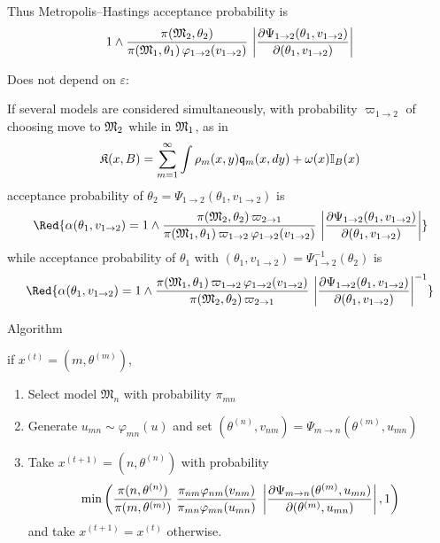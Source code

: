 \begin{slide}
Thus Metropolis--Hastings acceptance probability is
\small$$
1 \wedge \frac{\pi(\mathfrak{M}_2,\theta_2)}{\pi(\mathfrak{M}_1,\theta_1)\,
\varphi_{1\rightarrow 2}(v_{1\rightarrow 2})}\,
\left| \frac{\partial \Psi_{1\rightarrow 2}(\theta_1,v_{1\rightarrow 2})}{
\partial (\theta_1,v_{1\rightarrow 2}) }\right|
$$\normalsize

Does not depend on $\varepsilon$: 

\end{slide}\begin{slide}

If several models are considered simultaneously, with 
probability $\varpi_{1\rightarrow 2}$ of choosing move to $\mathfrak{M}_2$ while in $\mathfrak{M}_1$, 
as in 
\footnotesize$$
\mathfrak{K}(x,B) = \sum_{m=1}^\infty \int \rho_m(x,y) \mathfrak{q}_m(x,dy) + \omega(x)\mathbb{I}_B(x)
$$\normalsize
\pause
acceptance probability of $\theta_2=\Psi_{1\rightarrow 2}(\theta_1,v_{1\rightarrow 2})$ is
\small$$\Red{
\alpha(\theta_1,v_{1\rightarrow 2}) =
1 \wedge \frac{\pi(\GoM_2,\theta_2)\,\varpi_{2\rightarrow 1}}
{\pi(\GoM_1,\theta_1)\,\varpi_{1\rightarrow 2}\,
\varphi_{1\rightarrow 2}(v_{1\rightarrow 2})}\,
\left| \frac{\partial \Psi_{1\rightarrow 2}(\theta_1,v_{1\rightarrow 2})}{
\partial (\theta_1,v_{1\rightarrow 2}) } \right|
}$$\normalsize
\pause while acceptance probability of $\theta_1$ with 
$(\theta_1,v_{1\rightarrow 2})=\Psi_{1\rightarrow 2}^{-1}(\theta_2)$ is
\small$$
\Red{
\alpha(\theta_1,v_{1\rightarrow 2}) =
1 \wedge \frac{\pi(\GoM_1,\theta_1)\,\varpi_{1\rightarrow 2}\,
\varphi_{1\rightarrow 2}(v_{1\rightarrow 2})}{\pi(\GoM_2,\theta_2)\,\varpi_{2\rightarrow 1}}\,
\left| \frac{\partial \Psi_{1\rightarrow 2}(\theta_1,v_{1\rightarrow 2})}{
\partial (\theta_1,v_{1\rightarrow 2}) } \right|^{-1}
}$$
\normalsize

\end{slide}\begin{slide}

\begin{block}{Algorithm}
{ if $x^{(t)}=(m,\theta^{(m)})$,
\begin{enumerate}
\item Select model ${\mathfrak M}_n$ with probability $\pi_{mn}$
\item Generate $u_{mn}\sim\varphi_{mn}(u)$ and
                set $(\theta^{(n)},v_{nm})=\Psi_{m\rightarrow n}(\theta^{(m)},u_{mn})$
\item Take $x^{(t+1)} =( n,\theta^{(n)})$ with probability
\small$$
\min\left(
{\pi(n,\theta^{(n)}) \over \pi(m,\theta^{(m)})}
\;
{\pi_{nm} \varphi_{nm}(v_{nm}) \over \pi_{mn} \varphi_{mn}(u_{mn})}
\; \left| {\partial \Psi_{m\rightarrow n}(\theta^{(m)},u_{mn}) \over \partial
(\theta^{(m)},u_{mn})} \right|, 1 \right)
\normalsize$$
and take $x^{(t+1)} =x^{(t)}$ otherwise.
\end{enumerate}}\end{block}


\end{slide}
